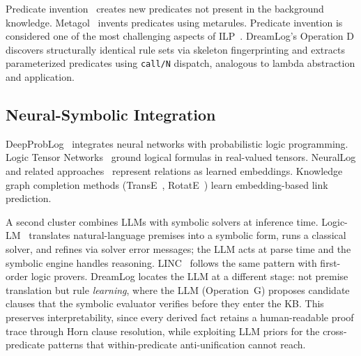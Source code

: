 \documentclass[10pt,conference]{IEEEtran}
\begin{document}
Predicate invention~\cite{stahl1995predicate,muggleton1988machine} creates new predicates not present in the background knowledge. Metagol~\cite{muggleton2014meta} invents predicates using metarules. Predicate invention is considered one of the most challenging aspects of ILP~\cite{cropper2022inductive}. DreamLog's Operation D discovers structurally identical rule sets via skeleton fingerprinting and extracts parameterized predicates using \texttt{call/N} dispatch, analogous to lambda abstraction and application.

\subsection{Neural-Symbolic Integration}

DeepProbLog~\cite{manhaeve2018deepproblog} integrates neural networks with probabilistic logic programming. Logic Tensor Networks~\cite{serafini2016logic} ground logical formulas in real-valued tensors. NeuralLog and related approaches~\cite{yang2017differentiable,battaglia2018relational} represent relations as learned embeddings. Knowledge graph completion methods (TransE~\cite{bordes2013translating}, RotatE~\cite{sun2019rotate}) learn embedding-based link prediction.

A second cluster combines LLMs with symbolic solvers at inference time. Logic-LM~\cite{pan2023logiclm} translates natural-language premises into a symbolic form, runs a classical solver, and refines via solver error messages; the LLM acts at parse time and the symbolic engine handles reasoning. LINC~\cite{olausson2023linc} follows the same pattern with first-order logic provers. DreamLog locates the LLM at a different stage: not premise translation but rule \emph{learning}, where the LLM (Operation~G) proposes candidate clauses that the symbolic evaluator verifies before they enter the KB. This preserves interpretability, since every derived fact retains a human-readable proof trace through Horn clause resolution, while exploiting LLM priors for the cross-predicate patterns that within-predicate anti-unification cannot reach.
\end{document}
